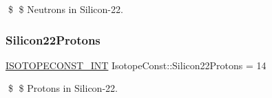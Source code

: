 \$ \$ Neutrons in Silicon-\/22. \mbox{\label{group___isotope_const-_silicon-_si22_ga73e20cfcc292aad3abb22333371de7c1}} 
\subsubsection{\texorpdfstring{Silicon22\+Protons}{Silicon22Protons}}
{\footnotesize\ttfamily \mbox{\hyperlink{group___isotope_const-_macros_ga5f18360b3e99483a35c32d789e62621c}{I\+S\+O\+T\+O\+P\+E\+C\+O\+N\+S\+T\+\_\+\+I\+NT}} Isotope\+Const\+::\+Silicon22\+Protons = 14}

\$ \$ Protons in Silicon-\/22. 